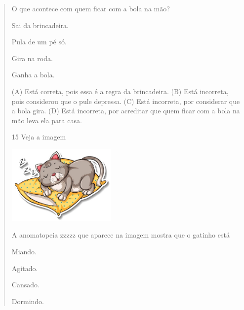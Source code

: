 \begin{verse}

O que acontece com quem ficar com a bola na mão?

\begin{escolha}
\item Sai da brincadeira.

\item Pula de um pé só.

\item Gira na roda.

\item Ganha a bola.
\end{escolha}


(A) Está correta, pois essa é a regra da brincadeira.
(B) Está incorreta, pois considerou que o pule depressa.
(C) Está incorreta, por considerar que a bola gira.
(D) Está incorreta, por acreditar que quem ficar com a bola na mão leva ela para casa.

\num{15} Veja a imagem

\includegraphics[width=2.09091in,height=1.52916in]{media/image161.jpeg}


A anomatopeia zzzzz que aparece na imagem mostra que o gatinho está

\begin{minipage}{.5\textwidth}
\begin{escolha}
\item Miando.

\item Agitado.

\item Cansado.

\item Dormindo.
\end{escolha}
\end{minipage}
\end{verse}
